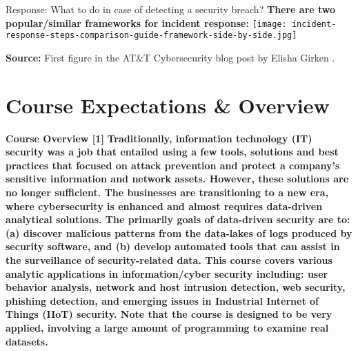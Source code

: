 \documentclass[aspectratio=169]{beamer} %
\begin{document}
\begin{frame}{Response: What to do in case of detecting a security breach?}
	\textbf{There are two popular/similar frameworks for incident response:}
	\centering 
	\texttt{[image: incident-response-steps-comparison-guide-framework-side-by-side.jpg]}
	
	\EndofPage
	
	\centering \scriptsize{\textbf{Source:} First figure in the AT\&T Cybersecurity blog post by Elisha Girken \cite{girken2020incident}.}
	
	\vspace{0.5\baselineskip}
\end{frame}

\section{Course Expectations \& Overview}
\begin{frame}{\textbf{Course Overview [1]}}
	\textbf{Traditionally, information technology (IT) security was a job that entailed using a few tools, solutions and best practices that focused on attack prevention and protect a company's sensitive information and network assets. However, these solutions are no longer sufficient. The businesses are transitioning to a new era, where cybersecurity is \textcolor{miamired}{enhanced and almost requires data-driven analytical solutions.} The primarily goals of data-driven security are to: (a) discover malicious patterns from the data-lakes of logs produced by security software, and (b) develop automated tools that can assist in the surveillance of security-related data. This course covers various analytic applications in information/cyber security including: \textcolor{miamired}{user behavior analysis, network and host intrusion detection, web security, phishing detection, and emerging issues in Industrial Internet of Things (IIoT) security.} Note that the course is designed to be \textcolor{miamired}{very applied, involving a large amount of programming to examine real datasets.}}
\end{frame}
\end{document}
